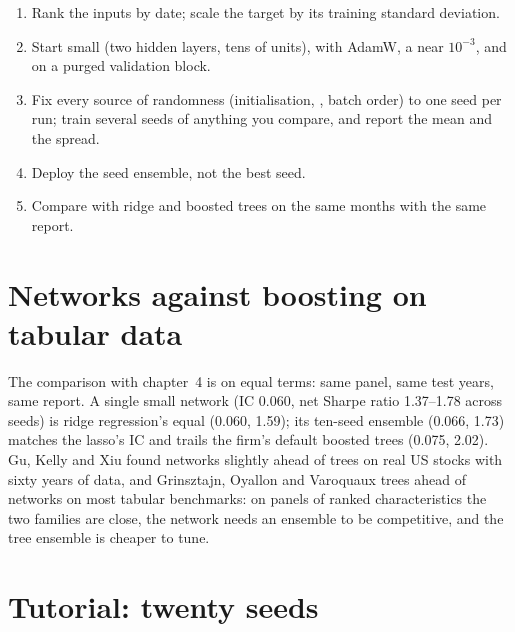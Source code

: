 \begin{method}\label{met:ml:nets:training}
\begin{enumerate}
\item Rank the inputs by date; scale the target by its training standard deviation.
\item Start small (two hidden layers, tens of units), with AdamW, a  near $10^{-3}$, and  on a
purged validation block.
\item Fix every source of randomness (initialisation, , batch order) to one seed per run; train several seeds of
anything you compare, and report the mean and the spread.
\item Deploy the seed ensemble, not the best seed.
\item Compare with ridge and boosted trees on the same months with the same report.
\end{enumerate}
\end{method}

\section{Networks against boosting on tabular data}

The comparison with chapter~4 is on equal terms: same panel, same test years, same report. A single small network
(IC 0.060, net Sharpe ratio 1.37--1.78 across seeds) is ridge regression's equal (0.060, 1.59); its ten-seed ensemble
(0.066, 1.73) matches the lasso's IC and trails the firm's default boosted trees (0.075, 2.02). Gu, Kelly and Xiu found
networks slightly ahead of trees on real US stocks with sixty years of data, and Grinsztajn, Oyallon and Varoquaux trees
ahead of networks on most tabular benchmarks: on panels of ranked characteristics the two families are close, the
network needs an ensemble to be competitive, and the tree ensemble is cheaper to tune.

\section{Tutorial: twenty seeds}\label{tut:ml:neural-networks-for-noisy-tabular-data:tut}

